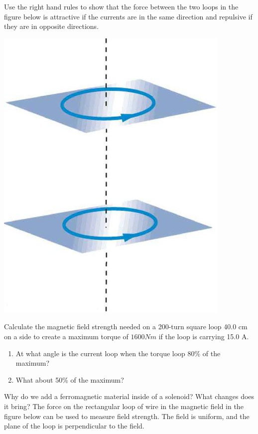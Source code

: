 \documentclass[9pt,addpoints]{exam}
\begin{document}
	\begin{questions}
		\question Use the right hand rules to show that the force between the two loops in the figure below is attractive if the currents are in the same direction and repulsive if they are in opposite directions.
		\begin{center}
			\includegraphics[scale=0.2]{loops}
		\end{center}
		\question Calculate the magnetic field strength needed on a 200-turn square loop 40.0 cm on a side to create a maximum torque of $1600Nm$ if the loop is carrying 15.0 A.
		\begin{enumerate}[label=(\alph*)]
			\item At what angle is the current loop when the torque loop 80\% of the maximum?
			\item What about 50\% of the maximum?
		\end{enumerate}
		\question Why do we add a ferromagnetic material inside of a solenoid? What changes does it bring?
		\question The force on the rectangular loop of wire in the magnetic field in the figure below can be used to measure field strength. The field is uniform, and the plane of the loop is perpendicular to the field.
		\begin{center}

\end{center}
\end{questions}
\end{document}
